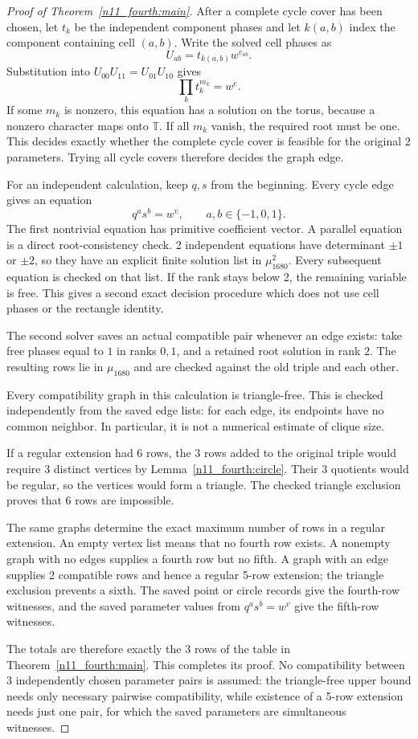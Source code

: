 \documentclass[11pt,a4paper]{article}
\theoremstyle{plain}
\theoremstyle{definition}
\theoremstyle{plain}
\begin{document}
\begin{proof}[Proof of Theorem~\ref{n11_fourth:main}]
After a complete cycle cover has been chosen, let $t_k$ be the independent component phases and let $k(a,b)$ index the component containing cell $(a,b)$. Write the solved cell phases as
$$U_{ab}=t_{k(a,b)}w^{e_{ab}}.$$
Substitution into $U_{00}U_{11}=U_{01}U_{10}$ gives
$$\prod_k t_k^{m_k}=w^{e}.$$
If some $m_k$ is nonzero, this equation has a solution on the torus, because a nonzero character maps onto $\mathbb T$. If all $m_k$ vanish, the required root must be one. This decides exactly whether the complete cycle cover is feasible for the original 2 parameters. Trying all cycle covers therefore decides the graph edge.

For an independent calculation, keep $q,s$ from the beginning. Every cycle edge gives an equation
\[
q^a s^b=w^{v},\qquad a,b\in\{-1,0,1\}.
\]
The first nontrivial equation has primitive coefficient vector. A parallel equation is a direct root-consistency check. 2 independent equations have determinant $\pm1$ or $\pm2$, so they have an explicit finite solution list in $\mu_{1680}^2$. Every subsequent equation is checked on that list. If the rank stays below 2, the remaining variable is free. This gives a second exact decision procedure which does not use cell phases or the rectangle identity.

The second solver saves an actual compatible pair whenever an edge exists: take free phases equal to $1$ in ranks $0,1$, and a retained root solution in rank $2$. The resulting rows lie in $\mu_{1680}$ and are checked against the old triple and each other.

Every compatibility graph in this calculation is triangle-free. This is checked independently from the saved edge lists: for each edge, its endpoints have no common neighbor. In particular, it is not a numerical estimate of clique size.

If a regular extension had 6 rows, the 3 rows added to the original triple would require 3 distinct vertices by Lemma~\ref{n11_fourth:circle}. Their 3 quotients would be regular, so the vertices would form a triangle. The checked triangle exclusion proves that 6 rows are impossible.

The same graphs determine the exact maximum number of rows in a regular extension. An empty vertex list means that no fourth row exists. A nonempty graph with no edges supplies a fourth row but no fifth. A graph with an edge supplies 2 compatible rows and hence a regular 5-row extension; the triangle exclusion prevents a sixth. The saved point or circle records give the fourth-row witnesses, and the saved parameter values from $q^as^b=w^v$ give the fifth-row witnesses.

The totals are therefore exactly the 3 rows of the table in Theorem~\ref{n11_fourth:main}. This completes its proof. No compatibility between 3 independently chosen parameter pairs is assumed: the triangle-free upper bound needs only necessary pairwise compatibility, while existence of a 5-row extension needs just one pair, for which the saved parameters are simultaneous witnesses.
\end{proof}
\end{document}
